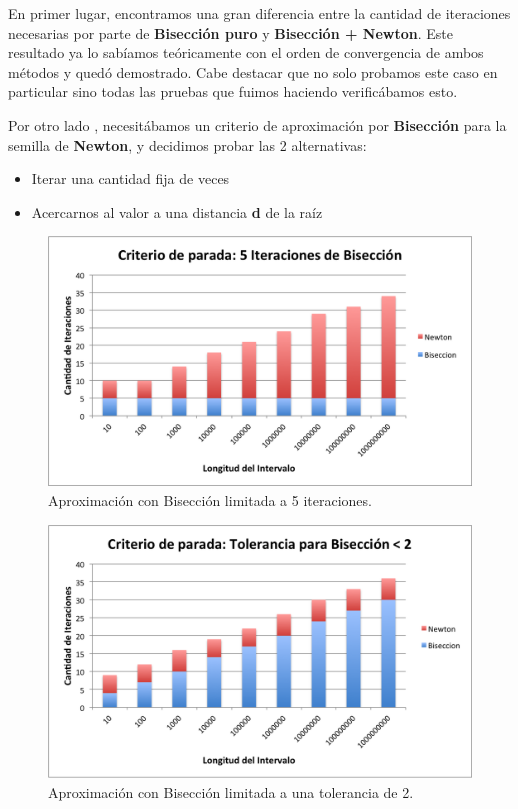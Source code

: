 \documentclass[a4paper]{article}
\begin{document}
En primer lugar, encontramos una gran diferencia entre la cantidad de iteraciones necesarias por parte de \textbf{Bisección puro} y \textbf{Bisección + Newton}. Este resultado ya lo sabíamos teóricamente con el orden de convergencia de ambos métodos y quedó demostrado. Cabe destacar que no solo probamos este caso en particular sino todas las pruebas que fuimos haciendo verificábamos esto.\\ \vspace{1em}
 
Por otro lado , necesitábamos un criterio de aproximación por \textbf{Bisección} para la semilla de \textbf{Newton}, y decidimos probar las 2 alternativas:
\begin{itemize}
  \item Iterar una cantidad fija de veces
  \item Acercarnos al valor a una distancia \textbf{d} de la raíz
\end{itemize}

\begin{figure}[H]
  \centering
  \includegraphics[scale=0.80]{graficos/2-BiseccionXIteraciones.png}
  \caption{Aproximación con Bisección limitada a 5 iteraciones. }
\end{figure}
 
\begin{figure}[H]
  \centering
  \includegraphics[scale=0.80]{graficos/3-BiseccionXTolerancia.png}
  \caption{Aproximación con Bisección limitada a una tolerancia de 2. }
\end{figure}
\end{document}
